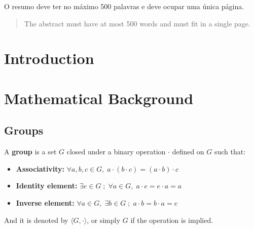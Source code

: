 \documentclass[Ingles]{ic-tese-v3}
\begin{document}


\begin{resumo}
O resumo deve ter no máximo 500 palavras e deve ocupar uma única página.
\end{resumo}


\begin{abstract}
The abstract must have at most 500 words and must fit in a single page.
\end{abstract}










\tableofcontents


\fimdaspaginasiniciais


\chapter{Introduction}

\chapter{Mathematical Background}

\section{Groups}
\begin{definition}
  A \textbf{group} is a set $G$ closed under a binary operation $\cdot$ defined on $G$ such
  that:
  \begin{itemize}
  \item \textbf{Associativity: } $\forall a,b,c \in G, \; a\cdot(b\cdot c) = (a\cdot b)\cdot c$
  \item \textbf{Identity element: } $\exists e \in G \; ; \; \forall a \in G, \; a\cdot e = e\cdot a = a$
  \item \textbf{Inverse element: } $\forall a \in G, \; \exists b \in G \; ; \; a\cdot b = b \cdot a = e$
  \end{itemize}
And it is denoted by $\langle G,\cdot\rangle$, or simply $G$ if the operation is implied.
\end{definition}
\end{document}
